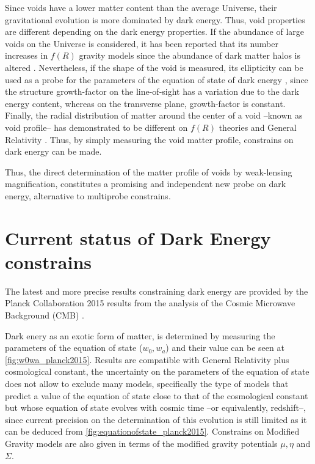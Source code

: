 Since voids have a lower matter content than the average Universe, their gravitational evolution is more dominated by dark energy. Thus, void properties are different depending on the dark energy properties. If the abundance of large voids on the Universe is considered, it has been reported that its number increases in $f(R)$ gravity models \cite{2012MNRAS.421.3481L} since the abundance of dark matter halos is altered \cite{2017JCAP...03..012V}. Nevertheless, if the shape of the void is measured, its ellipticity can be used as a probe for the parameters of the equation of state of dark energy \cite{2010MNRAS.403.1392L,0004-637X-754-2-109,PhysRevLett.98.081301,2013PhRvL.111x1103S}, since the structure growth-factor on the line-of-sight has a variation due to
the dark energy content, whereas on the transverse plane, growth-factor is constant. Finally, the radial distribution of matter around the center of a void --known as void profile-- has demonstrated to be different on $f(R)$ theories and General Relativity \cite{2014APh....54...44A,2014arXiv1410.8355C,2015MNRAS.451.4215Z,2015JCAP...08..028B,2016PhRvD..93j3522A,2016PhRvD..94j3524A}. Thus, by simply measuring the void matter profile, constrains on dark energy can be made.
\newline

Thus, the direct determination of the matter profile of voids by weak-lensing magnification, constitutes a promising and independent new probe on dark energy, alternative to multiprobe constrains.

\section{Current status of Dark Energy constrains}
The latest and more precise results constraining dark energy are provided by the Planck Collaboration 2015 results from the analysis of the Cosmic Microwave Background (CMB) \cite{2016A&A...594A..14P}.
\newline

Dark enery as an exotic form of matter, is determined by measuring the parameters of the equation of state ($w_0,w_a$) and their value can be seen at \autoref{fig:w0wa_planck2015}. Results are compatible with General Relativity plus cosmological constant, the uncertainty on the parameters of the equation of state does not allow to exclude many models, specifically the type of models that predict a value of the equation of state close to that of the cosmological constant but whose equation of state evolves with cosmic time --or equivalently, redshift--, since current precision on the determination of this evolution is still limited as it can be deduced from \autoref{fig:equationofstate_planck2015}. Constrains on Modified Gravity models are also given in terms of the modified gravity potentials $\mu,\eta$ and $\Sigma$.
\newline

